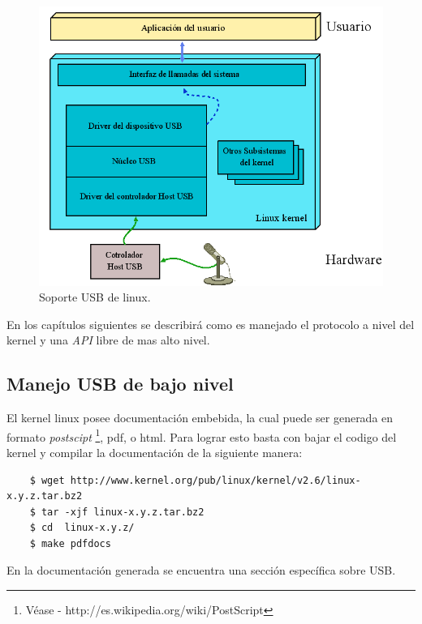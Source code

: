 \begin{figure}
\centering
\includegraphics[scale=0.5]{./img/usb_linux_layers.png}
\caption{Soporte USB de linux.}
\label{fig:usb_linux_layers}
\end{figure}


En los cap\'itulos siguientes se describir\'a como es
manejado el protocolo a nivel del kernel y una \emph{API} libre de mas alto
nivel.

\subsection{Manejo USB de bajo nivel}

El kernel linux posee documentaci\'on embebida, la cual puede ser generada en
formato \emph{postscipt} \footnote{V\'ease -
http://es.wikipedia.org/wiki/PostScript}, pdf, o html. Para lograr esto basta
con bajar el codigo del kernel y compilar la documentaci\'on de la siguiente
manera:

\begin{scriptsize}
	\begin{verbatim}
	$ wget http://www.kernel.org/pub/linux/kernel/v2.6/linux-x.y.z.tar.bz2
	$ tar -xjf linux-x.y.z.tar.bz2
	$ cd  linux-x.y.z/
	$ make pdfdocs
	\end{verbatim}
\end{scriptsize}

En la documentaci\'on generada se encuentra una secci\'on espec\'ifica sobre
USB.\\

